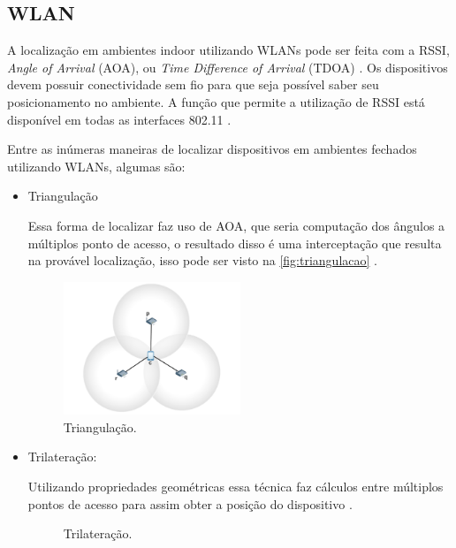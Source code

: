     \subsection{WLAN\label{subsection:wlan}}
    \par
    A localização em ambientes indoor utilizando WLANs pode ser feita com a RSSI, \textit{Angle of Arrival} (AOA), ou \textit{Time Difference of Arrival} (TDOA) \cite{wifiFernandes}. Os dispositivos devem possuir conectividade sem fio para que seja possível saber seu posicionamento no ambiente. A função que permite a utilização de RSSI está disponível em todas as interfaces 802.11 \cite{Wlan2012}.
    
    \par
    Entre as inúmeras maneiras de localizar dispositivos em ambientes fechados utilizando WLANs, algumas são: 
    \begin{itemize}
        \item {Triangulação}
        \par
        Essa forma de localizar faz uso de AOA, que seria computação dos ângulos a múltiplos ponto de acesso, o resultado disso é uma interceptação que resulta na provável localização, isso pode ser visto na \autoref{fig:triangulacao} \cite{wifiFernandes}. 
           \begin{figure}[H]
              \caption{\label{fig:triangulacao}{Triangulação.}}
              \centering
              \includegraphics[width=0.5\textwidth]{Figuras/triangulacao.PNG}
        \end{figure}
        \item {Trilateração: }
        \par 
       Utilizando propriedades geométricas essa técnica faz cálculos entre múltiplos pontos de acesso para assim obter a posição do dispositivo \cite{wifiFernandes}.
        \begin{figure}[H]
              \caption{\label{fig:trilateracao}{Trilateração.}}
              \centering

\end{figure}
\end{itemize}
